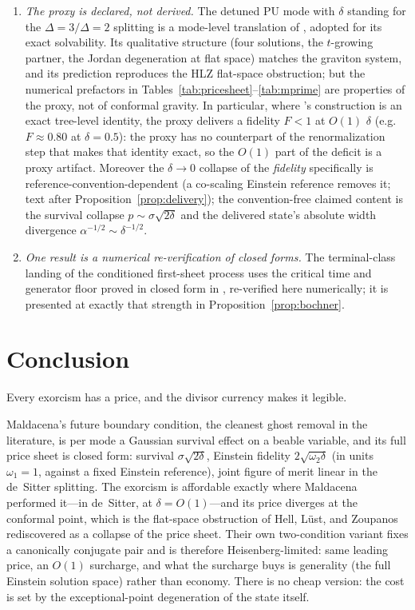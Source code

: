 \documentclass[11pt]{article}
\theoremstyle{definition}
\theoremstyle{remark}
\begin{document}
\begin{enumerate}
and we make no claim there.
\item \emph{The proxy is declared, not derived.} The detuned PU mode
with $\delta$ standing for the $\Delta=3/\Delta=2$ splitting is a
mode-level translation of \cite{Maldacena2011}, adopted for its
exact solvability. Its qualitative structure (four solutions, the
$t$-growing partner, the Jordan degeneration at flat space) matches
the graviton system, and its prediction reproduces the HLZ
flat-space obstruction; but the numerical prefactors in
Tables~\ref{tab:pricesheet}--\ref{tab:mprime} are properties of the
proxy, not of conformal gravity. In particular, where
\cite{Maldacena2011}'s construction is an exact tree-level identity, the
proxy delivers a fidelity $F<1$ at $O(1)$ $\delta$ (e.g.\ $F\approx0.80$
at $\delta=0.5$): the proxy has no counterpart of the renormalization
step that makes that identity exact, so the $O(1)$ part of the deficit
is a proxy artifact. Moreover the $\delta\to0$ collapse of the
\emph{fidelity} specifically is reference-convention-dependent (a
co-scaling Einstein reference removes it; text after
Proposition~\ref{prop:delivery}); the convention-free claimed content
is the survival collapse $p\sim\sigma\sqrt{2\delta}$ and the delivered
state's absolute width divergence $\alpha^{-1/2}\sim\delta^{-1/2}$.
\item \emph{One result is a numerical re-verification of closed
forms.} The terminal-class landing of the conditioned first-sheet
process uses the critical time and generator floor proved in closed
form in \cite{indivisible}, re-verified here numerically; it is
presented at exactly that strength in
Proposition~\ref{prop:bochner}.
\end{enumerate}

\section{Conclusion}
\label{sec:conclusion}

Every exorcism has a price, and the divisor currency makes it
legible.

Maldacena's future boundary condition, the cleanest ghost removal in
the literature, is per mode a Gaussian survival effect on a beable
variable, and its full price sheet is closed form: survival
$\sigma\sqrt{2\delta}$, Einstein fidelity $2\sqrt{\omega_{2}\delta}$
(in units $\omega_{1}=1$, against a fixed Einstein reference),
joint figure of merit linear in the de~Sitter splitting. The
exorcism is affordable exactly where Maldacena performed it---in
de~Sitter, at $\delta=O(1)$---and its price diverges at the conformal
point, which is the flat-space obstruction of Hell, L\"ust, and
Zoupanos rediscovered as a collapse of the price sheet. Their own
two-condition variant fixes a canonically conjugate pair and is
therefore Heisenberg-limited: same leading price, an $O(1)$
surcharge, and what the surcharge buys is generality (the full
Einstein solution space) rather than economy. There is no cheap
version: the cost is set by the exceptional-point degeneration of the
state itself.
\end{document}
